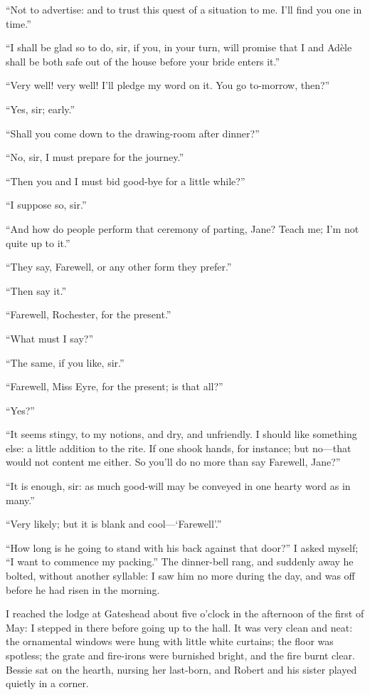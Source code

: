 \enquote{Not to advertise: and to trust this quest of a situation to
	me. I'll find you one in time.}

\enquote{I shall be glad so to do, sir, if you, in your turn, will
	promise that I and Adèle shall be both safe out of the house before your
	bride enters it.}

\enquote{Very well! very well! I'll pledge my word on it. You go
	to-morrow, then?}

\enquote{Yes, sir; early.}

\enquote{Shall you come down to the drawing-room after dinner?}

\enquote{No, sir, I must prepare for the journey.}

\enquote{Then you and I must bid good-bye for a little while?}

\enquote{I suppose so, sir.}

\enquote{And how do people perform that ceremony of parting, Jane?
	Teach me; I'm not quite up to it.}

\enquote{They say, Farewell, or any other form they prefer.}

\enquote{Then say it.}

\enquote{Farewell, \Mr{} Rochester, for the present.}

\enquote{What must I say?}

\enquote{The same, if you like, sir.}

\enquote{Farewell, Miss Eyre, for the present; is that all?}

\enquote{Yes?}

\enquote{It seems stingy, to my notions, and dry, and unfriendly. I
	should like something else: a little addition to the rite. If one shook
	hands, for instance; but no---that would not content me either. So
	you'll do no more than say Farewell, Jane?}

\enquote{It is enough, sir: as much good-will may be conveyed in one
	hearty word as in many.}

\enquote{Very likely; but it is blank and cool---\enquote{Farewell}.}

\enquote{How long is he going to stand with his back against that door?}
I asked myself; \enquote{I want to commence my packing.} The
dinner-bell rang, and suddenly away he bolted, without another syllable:
I saw him no more during the day, and was off before he had risen in the
morning.

I reached the lodge at Gateshead about five o'clock in the afternoon of
the first of May: I stepped in there before going up to the hall. It
was very clean and neat: the ornamental windows were hung with little
white curtains; the floor was spotless; the grate and fire-irons were
burnished bright, and the fire burnt clear. Bessie sat on the hearth,
nursing her last-born, and Robert and his sister played quietly in a
corner.

